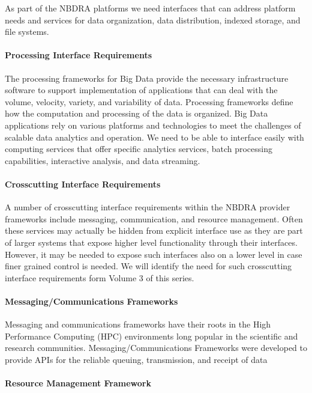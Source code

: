 \documentclass[10pt]{article}
\begin{document}
As part of the NBDRA platforms we need interfaces that can address
platform needs and services for data organization, data distribution,
indexed storage, and file systems.

\paragraph{Processing Interface Requirements}

The processing frameworks for Big Data provide the necessary
infrastructure software to support implementation of applications that
can deal with the volume, velocity, variety, and variability of data.
Processing frameworks define how the computation and processing of the
data is organized. Big Data applications rely on various platforms and
technologies to meet the challenges of scalable data analytics and
operation. We need to be able to interface easily with computing
services that offer specific analytics services, batch processing
capabilities, interactive analysis, and data streaming.

\paragraph{Crosscutting Interface Requirements}

A number of crosscutting interface requirements within the NBDRA
provider frameworks include messaging, communication, and resource
management. Often these services may actually be hidden from explicit
interface use as they are part of larger systems that expose higher
level functionality through their interfaces. However, it may be
needed to expose such interfaces also on a lower level in case finer
grained control is needed. We will identify the need for such
crosscutting interface requirements form Volume 3 \cite{nist-vol-3} of
this series.

\paragraph{Messaging/Communications Frameworks}

Messaging and communications frameworks have their roots in the High
Performance Computing (HPC) environments long popular in the
scientific and research communities. Messaging/Communications
Frameworks were developed to provide APIs for the reliable queuing,
transmission, and receipt of data

\paragraph{Resource Management Framework}
\end{document}
